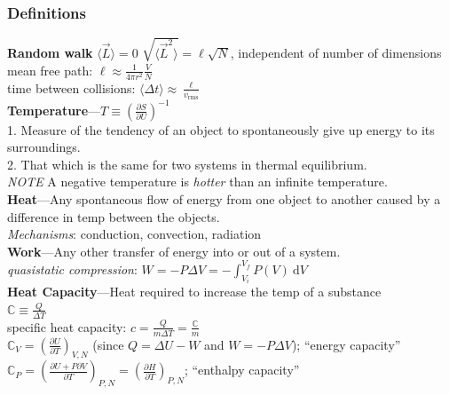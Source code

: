 \documentclass[letterpaper,landscape,10pt]{article}
\begin{document}
{\begin{multicols}{4}
  \subsubsection*{Definitions}
  \textbf{Random walk} $\langle \vec{L}\rangle =0$ $\sqrt{\langle \vec{L}^2\rangle}=\ell\sqrt{N}$, independent of number of dimensions \\
  mean free path: $\ell\approx \frac{1}{4\pi r^2}\frac{V}{N}$ \\
  time between collisions: $\langle \Delta t\rangle\approx \frac{\ell}{v_{\textrm{rms}}}$ \\
    \textbf{Temperature}---$T\equiv \left( \frac{\partial S}{\partial U} \right)^{-1}$\\
    1. Measure of the tendency of an object to spontaneously give up energy to
      its surroundings. \\
    2. That which is the same for two systems in thermal equilibrium. \\
    \emph{NOTE} A negative temperature is \emph{hotter} than an infinite
    temperature. \\
	\vspace{2.5pt}
  \textbf{Heat}---Any spontaneous flow of energy from one object to another
    caused by a difference in temp between the objects. \\
	\emph{Mechanisms}: conduction, convection, radiation \\
	\vspace{2.5pt}
  \textbf{Work}---Any other transfer of energy into or out of a system.\\
    \hspace{5pt}\emph{quasistatic compression}:
    $W=-P\Delta V = -\int_{V_i}^{V_f}P(V)\:\textrm{d}V$ \\
  \vspace{2.5pt}
	\textbf{Heat Capacity}---Heat required to increase the temp of a substance \\
	  \hspace{5pt} $\mathbb{C} \equiv \frac{Q}{\Delta T}$\\
	  \hspace{5pt} specific heat capacity: $c = \frac{Q}{m \Delta T} = \frac{\mathbb{C}}{m}$\\
	  \hspace{5pt} $\mathbb{C}_V = \left( \frac{\partial U}{\partial T} \right)_{V,N}$
	    (since $Q=\Delta U-W$ and $W=-P\Delta V$); ``energy capacity''\\
		\hspace{5pt} $\mathbb{C}_{P} = \left( \frac{\partial U + P\partial V}{\partial T} \right)_{P,N} = \left( \frac{\partial H}{\partial T} \right)_{P,N}$; ``enthalpy capacity''\\

\end{multicols}}
\end{document}
